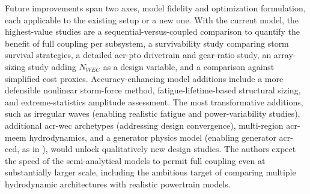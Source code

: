 \else
    Future improvements span two axes, model fidelity and optimization formulation, each applicable to the existing setup or a new one.
    With the current model, the highest-value studies are a sequential-versus-coupled comparison to quantify the benefit of full coupling per subsystem, a survivability study comparing storm survival strategies, a detailed \gls{acr-pto} drivetrain and gear-ratio study, an array-sizing study adding $N_{WEC}$ as a design variable, and a comparison against simplified cost proxies.
    Accuracy-enhancing model additions include a more defensible nonlinear storm-force method, fatigue-lifetime-based structural sizing, and extreme-statistics amplitude assessment.
    The most transformative additions, such as irregular waves (enabling realistic fatigue and power-variability studies), additional \gls{acr-wec} archetypes (addressing design convergence), multi-region \gls{acr-meem} hydrodynamics, and a generator physics model (enabling generator \gls{acr-ccd}, as in \citet{anderson_re-imagining_2024,barter_beyond_2023}), would unlock qualitatively new design studies.
    The authors expect the speed of the semi-analytical models to permit full coupling even at substantially larger scale, including the ambitious target of comparing multiple hydrodynamic architectures with realistic powertrain models.
\fi
